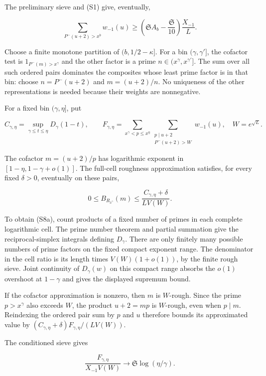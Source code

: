 The preliminary sieve and (S1) give, eventually,

\[
\sum_{P^-(u+2)>x^b}w_{-1}(u)
\ge\left(\mathfrak S A_b-\frac{\mathfrak S}{10}\right)
       \frac{X_{-1}}L. \tag{S7}
\]

Choose a finite monotone partition of \((b,1/2-\kappa]\). For a bin
\((\gamma,\gamma']\), the cofactor test is \(1_{P^-(m)>x^\gamma}\) and
the other factor is a prime \(n\in(x^\gamma,x^{\gamma'}]\). The sum over
all such ordered pairs dominates the composites whose least prime factor
is in that bin: choose \(n=P^-(u+2)\) and \(m=(u+2)/n\). No uniqueness
of the other representations is needed because their weights are
nonnegative.

For a fixed bin \((\gamma,\eta]\), put

\[
C_{\gamma,\eta}=\sup_{\gamma\le t\le\eta}D_\gamma(1-t),
\qquad
F_{\gamma,\eta}=
\sum_{x^\gamma<p\le x^\eta}
\sum_{\substack{p\mid u+2\\P^-(u+2)>W}}w_{-1}(u),
\quad W=e^{\sqrt L}.
\]

The cofactor \(m=(u+2)/p\) has logarithmic exponent in
\([1-\eta,1-\gamma+o(1)]\). The full-cell roughness approximation
satisfies, for every fixed \(\delta>0\), eventually on these pairs,

\[
0\le B_{R_{x^\gamma}}(m)
\le\frac{C_{\gamma,\eta}+\delta}{L V(W)}. \tag{S8a}
\]

To obtain (S8a), count products of a fixed number of primes in each
complete logarithmic cell. The prime number theorem and partial
summation give the reciprocal-simplex integrals defining \(D_\gamma\).
There are only finitely many possible numbers of prime factors on the
fixed compact exponent range. The denominator in the cell ratio is its
length times \(V(W)(1+o(1))\), by the finite rough sieve. Joint
continuity of \(D_\gamma(w)\) on this compact range absorbs the \(o(1)\)
overshoot at \(1-\gamma\) and gives the displayed supremum bound.

If the cofactor approximation is nonzero, then \(m\) is \(W\)-rough.
Since the prime \(p>x^\gamma\) also exceeds \(W\), the product
\(u+2=mp\) is \(W\)-rough, even when \(p\mid m\). Reindexing the ordered
pair sum by \(p\) and \(u\) therefore bounds its approximated value by
\((C_{\gamma,\eta}+\delta)F_{\gamma,\eta}/(LV(W))\).

The conditioned sieve gives

\[
\frac{F_{\gamma,\eta}}{X_{-1}V(W)}
\longrightarrow\mathfrak S\log(\eta/\gamma). \tag{S8b}
\]

